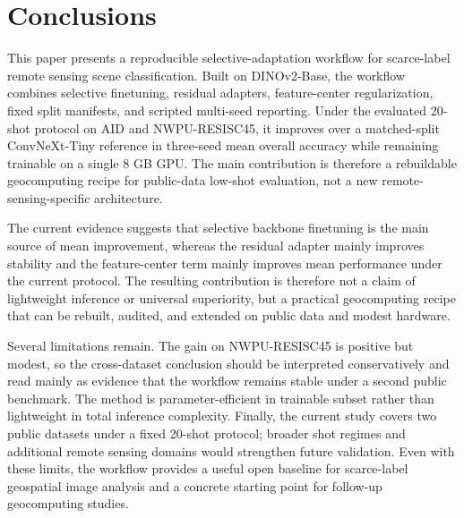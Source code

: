 \section{Conclusions}
\label{sec:conclusion}

This paper presents a reproducible selective-adaptation workflow for scarce-label remote sensing scene classification. Built on DINOv2-Base, the workflow combines selective finetuning, residual adapters, feature-center regularization, fixed split manifests, and scripted multi-seed reporting. Under the evaluated 20-shot protocol on AID and NWPU-RESISC45, it improves over a matched-split ConvNeXt-Tiny reference in three-seed mean overall accuracy while remaining trainable on a single 8 GB GPU. The main contribution is therefore a rebuildable geocomputing recipe for public-data low-shot evaluation, not a new remote-sensing-specific architecture.

The current evidence suggests that selective backbone finetuning is the main source of mean improvement, whereas the residual adapter mainly improves stability and the feature-center term mainly improves mean performance under the current protocol. The resulting contribution is therefore not a claim of lightweight inference or universal superiority, but a practical geocomputing recipe that can be rebuilt, audited, and extended on public data and modest hardware.

Several limitations remain. The gain on NWPU-RESISC45 is positive but modest, so the cross-dataset conclusion should be interpreted conservatively and read mainly as evidence that the workflow remains stable under a second public benchmark. The method is parameter-efficient in trainable subset rather than lightweight in total inference complexity. Finally, the current study covers two public datasets under a fixed 20-shot protocol; broader shot regimes and additional remote sensing domains would strengthen future validation. Even with these limits, the workflow provides a useful open baseline for scarce-label geospatial image analysis and a concrete starting point for follow-up geocomputing studies.
